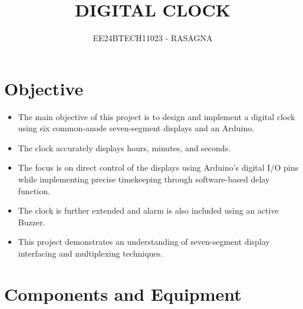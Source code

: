\documentclass[journal]{IEEEtran}
\begin{document}

\vspace{3cm}

\title{DIGITAL CLOCK}
\author{EE24BTECH11023 - RASAGNA}

{\let\newpage\relax\maketitle}

\renewcommand{\thefigure}{\theenumi}
\renewcommand{\thetable}{\theenumi}
\setlength{\intextsep}{10pt} %


\renewcommand{\thetable}{\theenumi}

\section{Objective}
\begin{itemize}
    \item The main objective of this project is to design and implement a digital clock using six common-anode seven-segment displays and an Arduino.
    \item The clock accurately displays hours, minutes, and seconds.
    \item The focus is on direct control of the displays using Arduino's digital I/O pins while implementing precise timekeeping through software-based delay function.
    \item The clock is further extended and alarm is also included using an active Buzzer.
    \item This project demonstrates an understanding of seven-segment display interfacing and multiplexing techniques.
\end{itemize}


\section{Components and Equipment}
\end{document}
